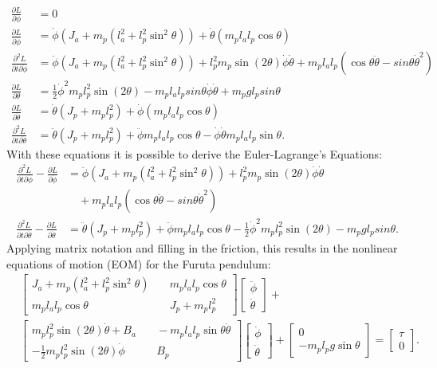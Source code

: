 \begin{align*}
	\frac{\partial L}{\partial \phi}&=0\\
	\frac{\partial L}{\partial 
	\dot{\phi}}&=\dot{\phi}(J_a+m_p(l_a^2+l_p^2\sin^2\theta))+\dot{\theta}(
	m_pl_al_p\cos\theta)\\
	\frac{\partial^2 L}{\partial t \partial \dot{\phi}}&= 
	\ddot{\phi}(J_a+m_p(l_a^2+l_p^2\sin^2 \theta))+l_p^2m_p\sin(2\theta)
	\dot{\phi}\dot{\theta}+m_pl_al_p(\cos 
	\theta\ddot{\theta}-sin\theta \dot{\theta}^2)\\
	\frac{\partial L}{\partial 
	\theta}&=\frac{1}{2}\dot{\phi}^2m_pl_p^2\sin(2\theta)-m_pl_al_psin\theta\dot{\phi}
	\dot{\theta}+m_pgl_psin\theta\\
	\frac{\partial L}{\partial 
		\dot{\theta}}&=\dot{\theta}(J_p+m_pl_p^2)+\dot{\phi}(m_pl_al_p\cos\theta)\\
	\frac{\partial^2 L}{\partial t \partial 
	\dot{\theta}}&=\ddot{\theta}(J_p+m_pl_p^2)+\ddot{\phi}m_pl_al_p\cos\theta-\dot{\phi}
	\dot{\theta}m_pl_al_p\sin\theta.
\end{align*}
With these equations it is possible to derive the 
Euler-Lagrange's Equations:
\begin{align*}
\frac{\partial^2 L}{\partial t\partial\dot{\phi}}-\frac{\partial 
L}{\partial\dot{\phi}}&=\ddot{\phi}(J_a+m_p(l_a^2+l_p^2\sin^2 
\theta))+l_p^2m_p\sin(2\theta)
\dot{\phi}\dot{\theta}\\ &\quad + m_pl_al_p(\cos 
\theta\ddot{\theta}-sin\theta \dot{\theta}^2)\\
\frac{\partial^2 L}{\partial t\partial\dot{\theta}}-\frac{\partial 
L}{\partial\dot{\theta}}&=\ddot{\theta}(J_p+m_pl_p^2)+\ddot{\phi}m_pl_al_p\cos\theta-\frac{1}{2}\dot{\phi}^2m_pl_p^2\sin(2\theta)-m_pgl_psin\theta
.\end{align*}
Applying matrix notation and filling in the friction, this results in 
the nonlinear equations of motion (EOM) for the Furuta pendulum:
\begin{align*}
&\begin{bmatrix}
J_a+m_p(l_a^2+l_p^2\sin^2\theta)& \quad m_pl_al_p\cos\theta \\ 
m_pl_al_p\cos\theta& \quad J_p+m_pl_p^2 
\end{bmatrix} 
\begin{bmatrix}
\ddot{\phi}\\
\ddot{\theta}
\end{bmatrix} + \\
&\begin{bmatrix}
m_pl_p^2\sin(2\theta)\dot{\theta}+ B_a& \quad -m_pl_al_p\sin \theta 
\dot{\theta}\\
-\frac{1}{2}m_pl_p^2\sin(2\theta)\dot{\phi} &\quad B_p
\end{bmatrix}
\begin{bmatrix}
\dot{\phi}\\
\dot{\theta}
\end{bmatrix} +
\begin{bmatrix}
0\\
-m_pl_pg\sin\theta
\end{bmatrix}=\begin{bmatrix}
\tau \\
0
\end{bmatrix}.
\end{align*}

